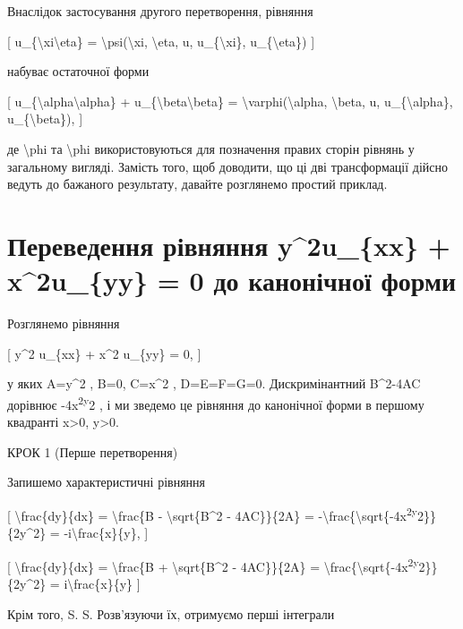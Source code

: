 \documentclass[
]{article}
\begin{document}
Внаслідок застосування другого перетворення, рівняння

{[} u\_\{\textbackslash xi\textbackslash eta\} =
\textbackslash psi(\textbackslash xi, \textbackslash eta, u,
u\_\{\textbackslash xi\}, u\_\{\textbackslash eta\}) {]}

набуває остаточної форми

{[} u\_\{\textbackslash alpha\textbackslash alpha\} +
u\_\{\textbackslash beta\textbackslash beta\} =
\textbackslash varphi(\textbackslash alpha, \textbackslash beta, u,
u\_\{\textbackslash alpha\}, u\_\{\textbackslash beta\}), {]}

де \textbackslash phi та \textbackslash phi використовуються для
позначення правих сторін рівнянь у загальному вигляді. Замість того, щоб
доводити, що ці дві трансформації дійсно ведуть до бажаного результату,
давайте розглянемо простий приклад.

\section{Переведення рівняння y\^{}2u\_\{xx\} + x\^{}2u\_\{yy\} = 0 до
канонічної
форми}\label{ux43fux435ux440ux435ux432ux435ux434ux435ux43dux43dux44f-ux440ux456ux432ux43dux44fux43dux43dux44f-y2u_xx-x2u_yy-0-ux434ux43e-ux43aux430ux43dux43eux43dux456ux447ux43dux43eux457-ux444ux43eux440ux43cux438}

Розглянемо рівняння

{[} y\^{}2 u\_\{xx\} + x\^{}2 u\_\{yy\} = 0, {]}

у яких A=y\^{}2 , B=0, C=x\^{}2 , D=E=F=G=0. Дискримінантний B\^{}2-4AC
дорівнює -4x\textsuperscript{2y}2 , і ми зведемо це рівняння до
канонічної форми в першому квадранті x\textgreater0, y\textgreater0.

КРОК 1 (Перше перетворення)

Запишемо характеристичні рівняння

{[} \textbackslash frac\{dy\}\{dx\} = \textbackslash frac\{B -
\textbackslash sqrt\{B\^{}2 - 4AC\}\}\{2A\} =
-\textbackslash frac\{\textbackslash sqrt\{-4x\textsuperscript{2y}2\}\}\{2y\^{}2\}
= -i\textbackslash frac\{x\}\{y\}, {]}

{[} \textbackslash frac\{dy\}\{dx\} = \textbackslash frac\{B +
\textbackslash sqrt\{B\^{}2 - 4AC\}\}\{2A\} =
\textbackslash frac\{\textbackslash sqrt\{-4x\textsuperscript{2y}2\}\}\{2y\^{}2\}
= i\textbackslash frac\{x\}\{y\} {]}

Крім того, S. S. Розв'язуючи їх, отримуємо перші інтеграли
\end{document}
